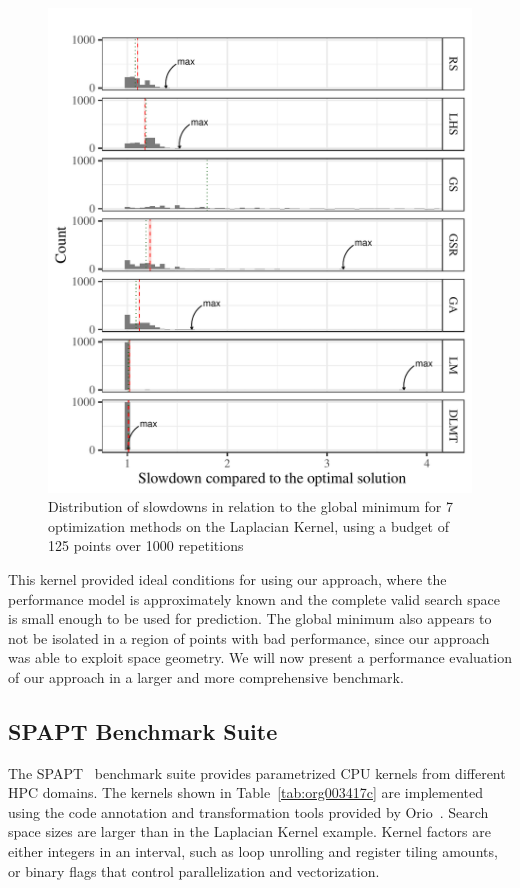 \documentclass[conference]{IEEEtran}
\begin{document}
\begin{figure}[t]\vspace{-.5cm}
\centering
\includegraphics[width=.9\columnwidth]{./img/comparison_histogram.pdf}
\caption{\label{fig:orgc6b9b86}
Distribution of slowdowns in relation to the global minimum for 7 optimization methods on the Laplacian Kernel, using a budget of 125 points over 1000 repetitions \vspace{-.5cm}}
\end{figure}

This kernel provided ideal conditions for using our approach, where the
performance model is approximately known and the complete valid search space is
small enough to be used for prediction. The global minimum also appears to not
be isolated in a region of points with bad performance, since our approach was
able to exploit space geometry. We will now present a performance evaluation of
our approach in a larger and more comprehensive benchmark.
\subsection{SPAPT Benchmark Suite}
\label{sec:org16c4105}
The SPAPT~\cite{balaprakash2012spapt} benchmark suite provides
parametrized CPU kernels from different HPC domains. The kernels shown in
Table~\ref{tab:org003417c} are implemented using the code annotation and
transformation tools provided by Orio~\cite{hartono2009annotation}. Search
space sizes are larger than in the Laplacian Kernel example. Kernel factors are
either integers in an interval, such as loop unrolling and register tiling
amounts, or binary flags that control parallelization and vectorization.
\end{document}
